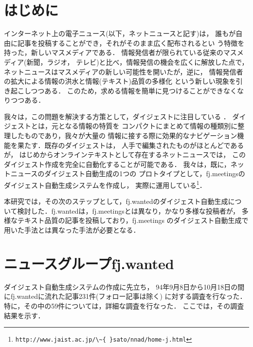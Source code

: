 

\maketitle


\clearpage
\section{はじめに}
インターネット上の電子ニュース(以下，ネットニュースと記す)は，
誰もが自由に記事を投稿することができ，それがそのまま広く配布されるとい
う特徴を持った，新しいマスメディアである．
情報発信者が限られている従来のマスメディア(新聞，ラジオ，
テレビ)と比べ，情報発信の機会を広くに解放した点で，
ネットニュースはマスメディアの新しい可能性を開いたが，逆に，
情報発信者の拡大による情報の洪水と情報(テキスト)品質の多様化
という新しい現象を引き起こしつつある．
このため，求める情報を簡単に見つけることができなくなりつつある．

我々は，この問題を解決する方策として，ダイジェストに注目している
\cite{Madoka-master-94,Madoka-ipsj-conf-94,Madoka-ipsj95}．
ダイジェストとは，元となる情報の特質を
コンパクトにまとめて情報の種類別に整理したものであり，我々が大量の
情報に接する際に効果的なナビゲーション機能を果たす．既存のダイジェストは，
人手で編集されたものがほとんどであるが，
はじめからオンラインテキストとして存在するネットニュースでは，
このダイジェスト作成を完全に自動化することが可能である．
我々は，既に，ネットニュースのダイジェスト自動生成の1つの
プロトタイプとして，fj.meetingsのダイジェスト自動生成システムを作成し，
実際に運用している\footnote{
\verb+http://www.jaist.ac.jp/\~{ }sato/nnad/home-j.html+}．

本研究では，その次のステップとして，fj.wantedのダイジェスト自動生成につ
いて検討した．fj.wantedは，fj.meetingsとは異なり，かなり多様な投稿者が，
多様なテキスト品質の記事を投稿しており，fj.meetings
のダイジェスト自動生成で用いた手法とは異なった手法が必要となる．

\section{ニュースグループfj.wanted}

ダイジェスト自動生成システムの作成に先立ち，
94年9月8日から10月18日の間にfj.wantedに流れた記事231件(フォロー記事は除く)
に対する調査を行なった．特に，その中の59件については，詳細な調査を行なった．
ここでは，その調査結果を示す．

